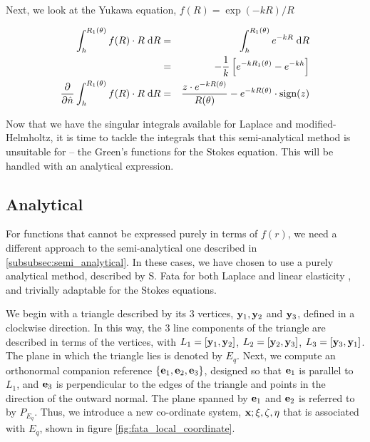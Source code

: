 Next, we look at the Yukawa equation, $f(R) = \exp(-kR) / R$

\begin{eqnarray}
	\int_h^{R_1(\theta)} f(R)\cdot R\;\text{d}R & = & \int_h^{R_1(\theta)}e^{-kR}\;\text{d}R \nonumber \\
	& = & -\frac{1}{k}\left [ e^{-kR_1(\theta)} - e^{-kh}\right ] \nonumber \\
	\frac{\partial }{\partial \hat{n}}\int_h^{R_1(\theta)} f(R)\cdot R\;\text{d}R & = & \frac{z\cdot e^{-kR(\theta)}}{R(\theta)} - e^{-kR(\theta)}\cdot\text{sign}(z) \nonumber
\end{eqnarray}

Now that we have the singular integrals available for Laplace and modified-Helmholtz, it is time to tackle the integrals that this semi-analytical method is unsuitable for -- the Green's functions for the Stokes equation. This will be handled with an analytical expression.

\subsection{Analytical}\label{subsubsec:analytical}

For functions that cannot be expressed purely in terms of $f(r)$, we need a different approach to the semi-analytical one described in \ref{subsubsec:semi_analytical}. In these cases, we have chosen to use a purely analytical method, described by S. Fata for both Laplace \cite{fata2009} and linear elasticity \cite{fata2011}, and trivially adaptable for the Stokes equations.

We begin with a triangle described by its 3 vertices, $\mathbf{y}_1, \mathbf{y}_2$ and $\mathbf{y}_3$, defined in a clockwise direction. In this way, the 3 line components of the triangle are described in terms of the vertices, with $L_1 = [\mathbf{y}_1, \mathbf{y}_2]$, $L_2 = [\mathbf{y}_2, \mathbf{y}_3]$, $L_3 = [\mathbf{y}_3, \mathbf{y}_1]$. The plane in which the triangle lies is denoted by $E_q$. Next, we compute an orthonormal companion reference $\{\mathbf{e}_1, \mathbf{e}_2, \mathbf{e}_3 \}$, designed so that $\mathbf{e}_1$ is parallel to $L_1$, and $\mathbf{e}_3$ is perpendicular to the edges of the triangle and points in the direction of the outward normal. The plane spanned by $\mathbf{e}_1$ and $\mathbf{e}_2$ is referred to by $P_{E_q}$. Thus, we introduce a new co-ordinate system, $\mathbf{x}; \xi, \zeta, \eta$ that is associated with $E_q$, shown in figure \ref{fig:fata_local_coordinate}.

